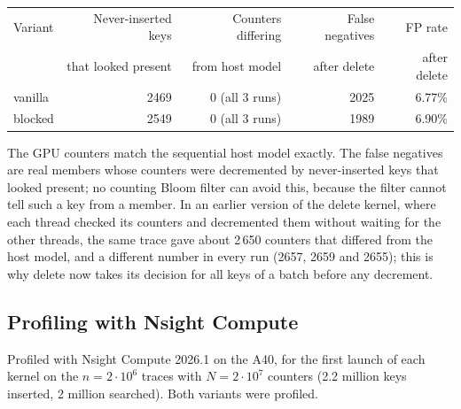 \documentclass[11pt]{article}
\begin{document}
\begin{center}
\begin{tabular}{lrrrr}
\toprule
Variant & Never-inserted keys & Counters differing & False negatives & FP rate \\
 & that looked present & from host model & after delete & after delete \\
\midrule
vanilla & 2469 & 0 (all 3 runs) & 2025 & 6.77\% \\
blocked & 2549 & 0 (all 3 runs) & 1989 & 6.90\% \\
\bottomrule
\end{tabular}
\end{center}
The GPU counters match the sequential host model exactly. The false negatives
are real members whose counters were decremented by never-inserted keys that
looked present; no counting Bloom filter can avoid this, because the filter
cannot tell such a key from a member. In an earlier version of the delete
kernel, where each thread checked its counters and decremented them without
waiting for the other threads, the same trace gave about 2\,650 counters that
differed from the host model, and a different number in every run (2657, 2659
and 2655); this is why delete now takes its decision for all keys of a batch
before any decrement.

\subsection*{Profiling with Nsight Compute}
Profiled with Nsight Compute 2026.1 on the A40, for the first launch of each
kernel on the $n=2\cdot10^6$ traces with $N=2\cdot10^7$ counters (2.2 million
keys inserted, 2 million searched). Both variants were profiled.
\end{document}
